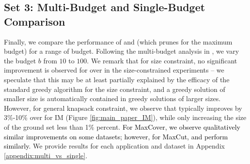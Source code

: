 \subsection{Set 3: Multi-Budget and  Single-Budget Comparison} \label{sec:multi_vs_single}

Finally, we compare the performance of \qs and \qss (which prunes for the maximum budget) for a range of budget.
Following the multi-budget analysis in \cite{ireland2022lense}, we vary the budget $b$ from $10$ to $100$.
We remark that for size constraint, no significant improvement is observed for  \qs{} over \qss{} in the size-constrained experiments
-- we speculate that this may be at least partially explained by the efficacy of the standard greedy
algorithm for the size constraint, and a greedy solution of smaller size is automatically
contained in greedy solutions of larger sizes. 
However, for general knapsack constraint,
we observe that \qs  typically improves by 3\%-10\% over \qss{} for IM (Figure \ref{fig:main_paper_IM}), 
while only increasing the size of the ground set less than 1\% percent. \textcolor{black}{For MaxCover, we observe qualitatively similar
  improvements on some datasets; however, for MaxCut, \qs and \qss perform similarly.}
We provide results for each application and dataset in Appendix \ref{appendix:multi_vs_single}.












